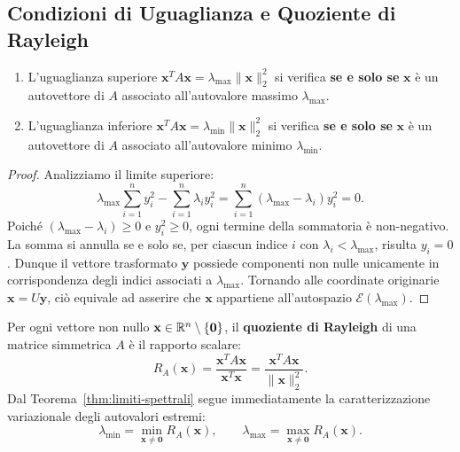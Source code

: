 \subsection{Condizioni di Uguaglianza e Quoziente di Rayleigh}

\begin{property}
\mbox{}\par\nopagebreak
\begin{enumerate}
    \item L'uguaglianza superiore $\mathbf{x}^T A \mathbf{x} = \lambda_{\max} \|\mathbf{x}\|_2^2$ si verifica \textbf{se e solo se} $\mathbf{x}$ \`e un autovettore di $A$ associato all'autovalore massimo $\lambda_{\max}$.
    \item L'uguaglianza inferiore $\mathbf{x}^T A \mathbf{x} = \lambda_{\min} \|\mathbf{x}\|_2^2$ si verifica \textbf{se e solo se} $\mathbf{x}$ \`e un autovettore di $A$ associato all'autovalore minimo $\lambda_{\min}$.
\end{enumerate}
\end{property}

\begin{proof}
Analizziamo il limite superiore:
\begin{equation}
    \lambda_{\max} \sum_{i=1}^n y_i^2 - \sum_{i=1}^n \lambda_i y_i^2 = \sum_{i=1}^n (\lambda_{\max} - \lambda_i) y_i^2 = 0.
\end{equation}
Poich\'e $(\lambda_{\max} - \lambda_i) \ge 0$ e $y_i^2 \ge 0$, ogni termine della sommatoria \`e non-negativo. La somma si annulla se e solo se, per ciascun indice $i$ con $\lambda_i < \lambda_{\max}$, risulta $y_i = 0$. Dunque il vettore trasformato $\mathbf{y}$ possiede componenti non nulle unicamente in corrispondenza degli indici associati a $\lambda_{\max}$. Tornando alle coordinate originarie $\mathbf{x} = U \mathbf{y}$, ci\`o equivale ad asserire che $\mathbf{x}$ appartiene all'autospazio $\mathcal{E}(\lambda_{\max})$.
\end{proof}

\begin{definition}
Per ogni vettore non nullo $\mathbf{x} \in \mathbb{R}^n \setminus \{\mathbf{0}\}$, il \textbf{quoziente di Rayleigh} di una matrice simmetrica $A$ \`e il rapporto scalare:
\begin{equation}
    R_A(\mathbf{x}) = \frac{\mathbf{x}^T A \mathbf{x}}{\mathbf{x}^T \mathbf{x}} = \frac{\mathbf{x}^T A \mathbf{x}}{\|\mathbf{x}\|_2^2}.
\end{equation}
Dal Teorema~\ref{thm:limiti-spettrali} segue immediatamente la caratterizzazione variazionale degli autovalori estremi:
\begin{equation}
    \lambda_{\min} = \min_{\mathbf{x} \neq \mathbf{0}} R_A(\mathbf{x}), \qquad \lambda_{\max} = \max_{\mathbf{x} \neq \mathbf{0}} R_A(\mathbf{x}).
\end{equation}
\end{definition}

